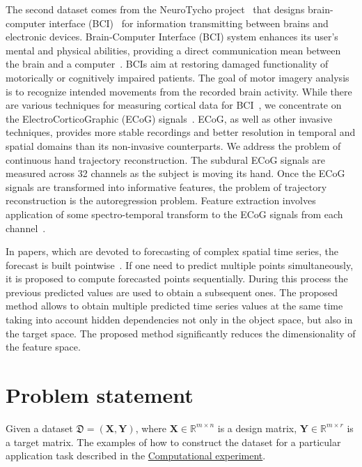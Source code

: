 \documentclass[12pt,twoside]{article}
\newcommand{\bY}{\mathbf{Y}}
\newcommand{\bX}{\mathbf{X}}
\begin{document}
The second dataset comes from the NeuroTycho project~\cite{neurotycho} that designs brain-computer interface (BCI)~\cite{millan2010combining,mason2007comprehensive} for information transmitting between brains and electronic devices.
Brain-Computer Interface (BCI) system enhances its user’s mental and physical abilities, providing a direct communication mean between the brain and a computer~\cite{millan2004brain}. 
BCIs aim at restoring damaged functionality of motorically or cognitively impaired patients.
The goal of motor imagery analysis is to recognize intended movements from the recorded brain activity. 
While there are various techniques for measuring cortical data for BCI~\cite{nicolas2012brain,amiri2013review}, we concentrate on the ElectroCorticoGraphic (ECoG) signals~\cite{eliseyev2016penalized}. 
ECoG, as well as other invasive techniques, provides more stable recordings and better resolution in temporal and spatial domains than its non-invasive counterparts.
We address the problem of continuous hand trajectory reconstruction. 
The subdural ECoG signals are measured across 32 channels as the subject is moving its hand.
Once the ECoG signals are transformed into informative features, the problem of trajectory reconstruction is the autoregression problem. 
Feature extraction involves application of some spectro-temporal transform to the ECoG signals from each channel~\cite{gasanov2017pls}.

In papers, which are devoted to forecasting of complex spatial time series, the forecast is built pointwise~\cite{box2015time,zhang2003time}.
If one need to predict multiple points simultaneously, it is proposed to compute forecasted points sequentially.
During this process the previous predicted values are used to obtain a subsequent ones.
The proposed method allows to obtain multiple predicted time series values at the same time taking into account hidden dependencies not only in the object space, but also in the target space.
The proposed method significantly reduces the dimensionality of the feature space.
 

\section{Problem statement}

Given a dataset $\mathfrak{D}= \left( \bX, \bY \right)$, where $\mathbf{X} \in \mathbb{R}^{m \times n}$ is a design matrix, $\mathbf{Y} \in \mathbb{R}^{m \times r}$ is a target matrix. 
The examples of how to construct the dataset for a particular application task described in the \hyperref[sec:exper]{Computational experiment}.
\end{document}
